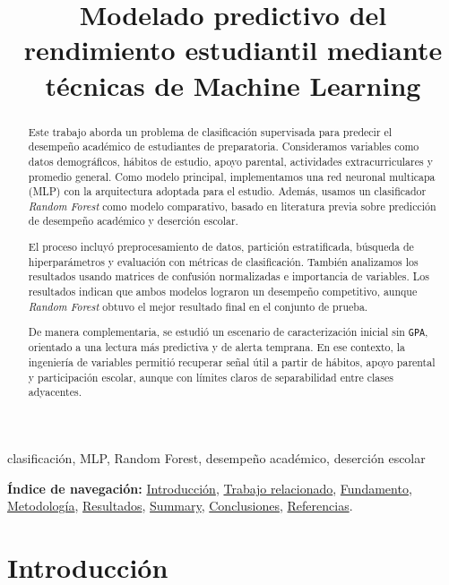 \documentclass[conference]{IEEEtran}
\title{Modelado predictivo del rendimiento estudiantil mediante técnicas de Machine Learning}
\author{
\IEEEauthorblockN{Ramos Aguilera Rubén \and Torres Laveaga Manuel}
\IEEEauthorblockA{ \\ }
}
\begin{document}
\maketitle
\pagestyle{plain}
\raggedbottom

\begin{abstract}
Este trabajo aborda un problema de clasificación supervisada para predecir el desempeño académico de estudiantes de preparatoria. Consideramos variables como datos demográficos, hábitos de estudio, apoyo parental, actividades extracurriculares y promedio general. Como modelo principal, implementamos una red neuronal multicapa (MLP) con la arquitectura adoptada para el estudio. Además, usamos un clasificador \textit{Random Forest} como modelo comparativo, basado en literatura previa sobre predicción de desempeño académico y deserción escolar.

El proceso incluyó preprocesamiento de datos, partición estratificada, búsqueda de hiperparámetros y evaluación con métricas de clasificación. También analizamos los resultados usando matrices de confusión normalizadas e importancia de variables. Los resultados indican que ambos modelos lograron un desempeño competitivo, aunque \textit{Random Forest} obtuvo el mejor resultado final en el conjunto de prueba.

De manera complementaria, se estudió un escenario de caracterización inicial sin \texttt{GPA}, orientado a una lectura más predictiva y de alerta temprana. En ese contexto, la ingeniería de variables permitió recuperar señal útil a partir de hábitos, apoyo parental y participación escolar, aunque con límites claros de separabilidad entre clases adyacentes.
\end{abstract}

\begin{IEEEkeywords}
clasificación, MLP, Random Forest, desempeño académico, deserción escolar
\end{IEEEkeywords}

\vspace{0.3em}
\noindent\textbf{Índice de navegación:}
\hyperref[sec:introduccion]{Introducción},
\hyperref[sec:relacionado]{Trabajo relacionado},
\hyperref[sec:fundamento]{Fundamento},
\hyperref[sec:metodologia]{Metodología},
\hyperref[sec:resultados]{Resultados},
\hyperref[sec:summary]{Summary},
\hyperref[sec:conclusiones]{Conclusiones},
\hyperref[sec:referencias]{Referencias}.
\vspace{0.4em}

\section{Introducción}\label{sec:introduccion}
\end{document}
